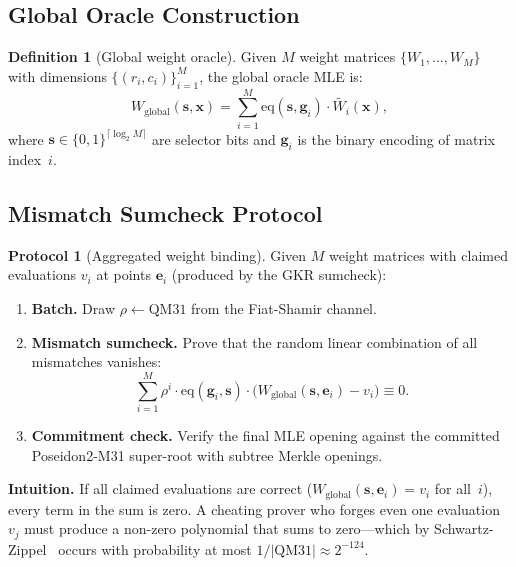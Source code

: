 \documentclass[10pt,twocolumn]{article}
\theoremstyle{definition}
\newtheorem{definition}[theorem]{Definition}
\newtheorem{protocol}[theorem]{Protocol}
\theoremstyle{remark}
\newcommand{\QM}{\mathrm{QM31}}
\newcommand{\eq}{\mathrm{eq}}
\newcommand{\MLE}{\widetilde}
\begin{document}
\subsection{Global Oracle Construction}

\begin{definition}[Global weight oracle]\label{def:global-oracle}
  Given $M$ weight matrices $\{W_1,\ldots,W_M\}$ with dimensions
  $\{(r_i,c_i)\}_{i=1}^M$, the global oracle MLE is:
  \begin{equation}\label{eq:global}
    W_{\text{global}}(\mathbf{s},\mathbf{x})
    = \sum_{i=1}^{M} \eq(\mathbf{s},\mathbf{g}_i)
      \cdot \MLE{W_i}(\mathbf{x}),
  \end{equation}
  where $\mathbf{s}\in\{0,1\}^{\lceil\log_2 M\rceil}$ are selector bits
  and $\mathbf{g}_i$ is the binary encoding of matrix index~$i$.
\end{definition}

\subsection{Mismatch Sumcheck Protocol}

\begin{protocol}[Aggregated weight binding]\label{prot:binding}
  Given $M$ weight matrices with claimed evaluations $v_i$ at
  points $\mathbf{e}_i$ (produced by the GKR sumcheck):
  \begin{enumerate}[nosep,leftmargin=1.4em]
    \item \textbf{Batch.} Draw $\rho\leftarrow\QM$ from the
          Fiat-Shamir channel.
    \item \textbf{Mismatch sumcheck.} Prove that the random
          linear combination of all mismatches vanishes:
      \begin{equation}\label{eq:binding}
        \sum_{i=1}^{M} \rho^i \cdot \eq(\mathbf{g}_i,\mathbf{s})
        \cdot \bigl(W_{\text{global}}(\mathbf{s},\mathbf{e}_i) - v_i\bigr) \equiv 0.
      \end{equation}
    \item \textbf{Commitment check.} Verify the final MLE opening
          against the committed Poseidon2-M31 super-root
          with subtree Merkle openings.
  \end{enumerate}
\end{protocol}

\textbf{Intuition.}
If all claimed evaluations are correct
($W_{\text{global}}(\mathbf{s},\mathbf{e}_i) = v_i$ for all~$i$),
every term in the sum is zero.
A cheating prover who forges even one evaluation $v_j$ must
produce a non-zero polynomial that sums to zero---which
by Schwartz-Zippel~\cite{schwartz1980,zippel1979} occurs with
probability at most $1/|\QM|\approx 2^{-124}$.
\end{document}
